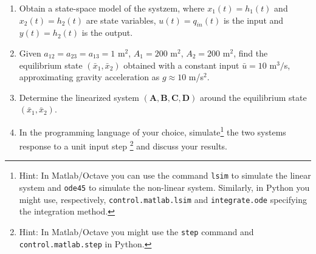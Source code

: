 \documentclass[a4paper,11pt]{article}
\begin{document}
\begin{enumerate}
\item Obtain a state-space model of the systzem, where $x_1(t)=h_1(t)$ and $x_2(t)=h_2(t)$ are state variables, $u(t)=q_{in}(t)$ is the input and $y(t)=h_2(t)$ is the output. 
\item Given $a_{12}=a_{23}=a_{13}= 1$ m$^2$, $A_1=200$ m$^2$, $A_2=200$ m$^2$, find the equilibrium state $(\bar{x}_1,\bar{x}_2)$ obtained with a constant input $\bar{u}=10$ m$^3/$s, approximating gravity acceleration as $g\approx 10$ m/s$^2$.
\item Determine the linearized system $(\mathbf{A},\mathbf{B},\mathbf{C},\mathbf{D})$ around the equilibrium state $(\bar{x}_1,\bar{x}_2)$.
\item In the programming language of your choice, simulate\footnote{Hint: In Matlab/Octave you can use the command {\tt lsim} to simulate the linear system and {\tt ode45} to simulate the non-linear system. Similarly, in Python you might use, respectively, {\tt control.matlab.lsim} and {\tt integrate.ode} specifying the integration method.} the two systems response to a unit input step \footnote{Hint: In Matlab/Octave you might use the {\tt step} command and {\tt control.matlab.step} in Python.} and discuss your results.
\end{enumerate}
\end{document}
